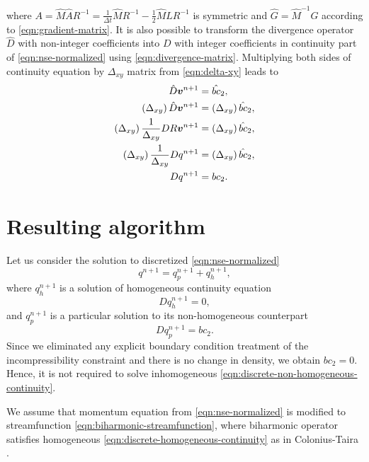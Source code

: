 \documentclass{article}
\numberwithin{equation}{section}
\begin{document}
where $A=\hat{M}\hat{A}R^{-1}=\frac{1}{\Delta t}\hat{M}R^{-1}-\frac{1}{2}\hat{M}\hat{L}R^{-1}$ is symmetric and $\hat{G}=\hat{M}^{-1}G$ according to \cref{eqn:gradient-matrix}. It is also possible to transform the divergence operator $\hat{D}$ with non-integer coefficients into $D$ with integer coefficients in continuity part of \cref{eqn:nse-normalized} using  \cref{eqn:divergence-matrix}. Multiplying both sides of continuity equation by $\Delta _{xy}$ matrix from \cref{eqn:delta-xy} leads to 
\begin{align*}
	\hat{D}\boldsymbol{v}^{n+1}&= \hat{bc}_2,\notag\\
	\left(\Delta_{xy} \right)\hat{D}\boldsymbol{v}^{n+1}&=\left ( \Delta_{xy}\right ) \hat{bc}_2,\notag\\
	\left(\Delta_{xy}\right)\frac{1}{\Delta _{xy}}{D}R\boldsymbol{v}^{n+1}&=\left ( \Delta_{xy}\right ) \hat{bc}_2,\notag\\
	\left(\Delta_{xy}\right)\frac{1}{\Delta_{xy}}{D}q^{n+1}&=\left ( \Delta_{xy}\right ) \hat{bc}_2,\notag\\
	D{q}^{n+1}&=bc_2.
\end{align*}



\pagebreak
\section{Resulting algorithm}\label{sec:algorithm}
Let us consider the solution to discretized \cref{eqn:nse-normalized}
\begin{equation*}
	q^{n+1}=q^{n+1}_p+q^{n+1}_h,
\end{equation*}
where $q^{n+1}_h$ is a solution of homogeneous continuity equation 
\begin{equation}\label{eqn:discrete-homogeneous-continuity}
	Dq^{n+1}_h=0,
\end{equation}
and $q^{n+1}_p$ is a particular solution to its non-homogeneous counterpart
\begin{equation}\label{eqn:discrete-non-homogeneous-continuity}
	Dq^{n+1}_p=bc_2.
\end{equation}
Since we eliminated any explicit boundary condition treatment of the incompressibility constraint and there is no change in density, we obtain $bc_2=0$. Hence, it is not required to solve inhomogeneous \cref{eqn:discrete-non-homogeneous-continuity}.

We assume that momentum equation from \cref{eqn:nse-normalized} is modified to streamfunction \cref{eqn:biharmonic-streamfunction}, where biharmonic operator satisfies homogeneous \cref{eqn:discrete-homogeneous-continuity} as in Colonius-Taira \cite{Colonius:2008}. 
\end{document}
